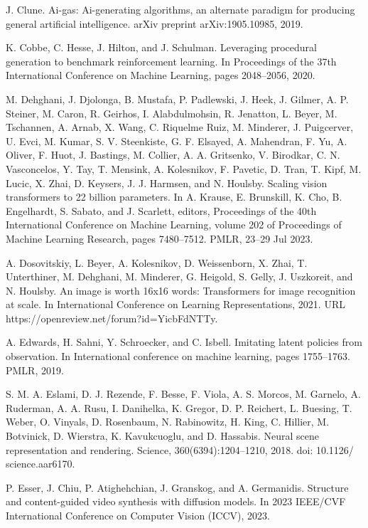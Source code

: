 \documentclass[10pt]{article}
\begin{document}
J. Clune. Ai-gas: Ai-generating algorithms, an alternate paradigm for producing general artificial intelligence. arXiv preprint arXiv:1905.10985, 2019.

K. Cobbe, C. Hesse, J. Hilton, and J. Schulman. Leveraging procedural generation to benchmark reinforcement learning. In Proceedings of the 37th International Conference on Machine Learning, pages 2048–2056, 2020.

M. Dehghani, J. Djolonga, B. Mustafa, P. Padlewski, J. Heek, J. Gilmer, A. P. Steiner, M. Caron, R. Geirhos, I. Alabdulmohsin, R. Jenatton, L. Beyer, M. Tschannen, A. Arnab, X. Wang, C. Riquelme Ruiz, M. Minderer, J. Puigcerver, U. Evci, M. Kumar, S. V. Steenkiste, G. F. Elsayed, A. Mahendran, F. Yu, A. Oliver, F. Huot, J. Bastings, M. Collier, A. A. Gritsenko, V. Birodkar, C. N. Vasconcelos, Y. Tay, T. Mensink, A. Kolesnikov, F. Pavetic, D. Tran, T. Kipf, M. Lucic, X. Zhai, D. Keysers, J. J. Harmsen, and N. Houlsby. Scaling vision transformers to 22 billion parameters. In A. Krause, E. Brunskill, K. Cho, B. Engelhardt, S. Sabato, and J. Scarlett, editors, Proceedings of the 40th International Conference on Machine Learning, volume 202 of Proceedings of Machine Learning Research, pages 7480–7512. PMLR, 23–29 Jul 2023.

A. Dosovitskiy, L. Beyer, A. Kolesnikov, D. Weissenborn, X. Zhai, T. Unterthiner, M. Dehghani, M. Minderer, G. Heigold, S. Gelly, J. Uszkoreit, and N. Houlsby. An image is worth 16x16 words: Transformers for image recognition at scale. In International Conference on Learning Representations, 2021. URL https://openreview.net/forum?id=YicbFdNTTy.

A. Edwards, H. Sahni, Y. Schroecker, and C. Isbell. Imitating latent policies from observation. In International conference on machine learning, pages 1755–1763. PMLR, 2019.

S. M. A. Eslami, D. J. Rezende, F. Besse, F. Viola, A. S. Morcos, M. Garnelo, A. Ruderman, A. A. Rusu, I. Danihelka, K. Gregor, D. P. Reichert, L. Buesing, T. Weber, O. Vinyals, D. Rosenbaum, N. Rabinowitz, H. King, C. Hillier, M. Botvinick, D. Wierstra, K. Kavukcuoglu, and D. Hassabis. Neural scene representation and rendering. Science, 360(6394):1204–1210, 2018. doi: 10.1126/ science.aar6170.

P. Esser, J. Chiu, P. Atighehchian, J. Granskog, and A. Germanidis. Structure and content-guided video synthesis with diffusion models. In 2023 IEEE/CVF International Conference on Computer Vision (ICCV), 2023.
\end{document}
